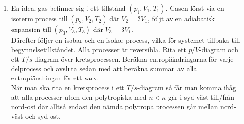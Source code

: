 \documentclass[./exercises.tex]{subfiles}
\begin{document}
\begin{enumerate}
\vfill\null
\clearpage
\columnbreak
\newpage


\item En ideal gas befinner sig i ett tillstånd  $(p_1,V_1,T_1)$.
Gasen först via en isoterm process till $(p_2,V_2,T_2)$ där $V_2 = 2V_1$,
följt av en adiabatisk expansion till $(p_3,V_3,T_3)$ där $V_3 = 3V_1$.\\
Därefter följer en isobar och en isokor process, vilka för systemet tillbaka
till begynnelsetillståndet.
Alla processer är reversibla.
Rita ett $p/V$-diagram och ett $T/s$-diagram över kretsprocessen.
Beräkna entropiändringarna för varje delprocess och
avsluta sedan med att beräkna summan av alla entropiändringar för ett varv.\\

När man ska rita en kretsprocess i ett $T/s$-diagram så får man komma ihåg
att alla processer utom den polytropiska med $n < \kappa$ går i
syd-väst till/från nord-ost där alltså endast den nämda polytropa
processen går mellan nord-väst och syd-ost.


\end{enumerate}
\end{document}
